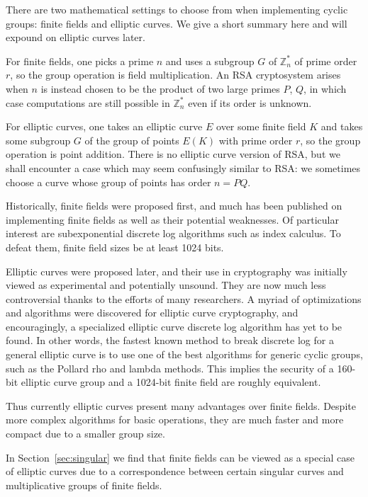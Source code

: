 There are two mathematical settings to choose from
when implementing cyclic groups: finite fields and elliptic curves.
We give a short summary here and will expound on elliptic curves later.

For finite fields, one picks a prime $n$ and uses
a subgroup $G$ of $\mathbb{Z}_n^*$
of prime order $r$, so the group operation is field multiplication.
An RSA cryptosystem arises when $n$ is instead chosen to be the
product of two
large primes $P$, $Q$, in which case computations are still possible
in $\mathbb{Z}_n^*$ even if its order is unknown.

For elliptic curves, one takes an elliptic curve $E$ over some
finite field $K$ and takes some subgroup $G$ of the group of points
$E(K)$ with prime order $r$, so the group operation is point addition.
There is no elliptic curve version of RSA, but we shall encounter
a case which may seem confusingly similar to RSA: we sometimes choose
a curve whose group of points has order $n = PQ$.

Historically, finite fields were proposed first, and much has been published on
implementing finite fields as well as their potential weaknesses. Of particular
interest are subexponential discrete log algorithms such as index calculus.
To defeat them, finite field sizes be at least 1024 bits.

Elliptic curves were proposed later, and their use in cryptography was
initially viewed as experimental and potentially unsound. They are now much
less controversial thanks to the efforts of many researchers. A myriad of
optimizations and algorithms were discovered for elliptic curve cryptography,
and encouragingly, a specialized elliptic curve discrete log algorithm has yet
to be found. In other words, the fastest known method to break discrete log for
a general elliptic curve is to use one of the best algorithms for generic
cyclic groups, such as the Pollard rho and lambda methods. This implies the
security of a 160-bit elliptic curve group and a 1024-bit finite field are
roughly equivalent.

Thus currently elliptic curves present many advantages over finite fields.
Despite more complex algorithms for basic operations, they are much faster
and more compact due to a smaller group size.

In Section~\ref{sec:singular} we find that
finite fields can be viewed as a special case of elliptic
curves due to a correspondence between certain singular curves and
multiplicative groups of finite fields.

